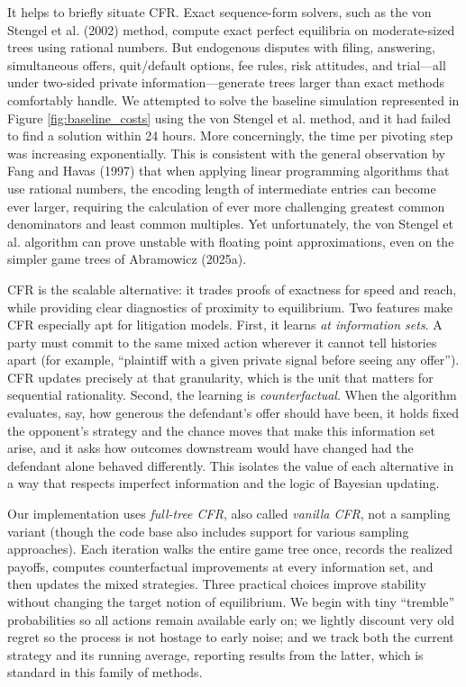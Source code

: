 \documentclass{article}
\begin{document}
It helps to briefly situate CFR. Exact sequence-form solvers, such as the von Stengel et al. (2002) \cite{vonstengelvandenelzentalman} method, compute exact perfect equilibria on moderate-sized trees using rational numbers. But endogenous disputes with filing, answering, simultaneous offers, quit/default options, fee rules, risk attitudes, and trial—all under two-sided private information—generate trees  larger than exact methods comfortably handle. We attempted to solve the baseline simulation represented in Figure \ref{fig:baseline_costs} using the von Stengel et al. method, and it had failed to find a solution within 24 hours. More concerningly, the time per pivoting step was increasing exponentially. This is consistent with the general observation by Fang and Havas (1997) \cite{fanghavas} that when applying linear programming algorithms that use rational numbers, the encoding length of intermediate entries can become ever larger, requiring the calculation of ever more challenging greatest common denominators and least common multiples. Yet unfortunately, the von Stengel et al. algorithm can prove unstable with floating point approximations, even on the simpler game trees of Abramowicz (2025a).

CFR is the scalable alternative: it trades proofs of exactness for speed and reach, while providing clear diagnostics of proximity to equilibrium. Two features make CFR especially apt for litigation models. First, it learns \emph{at information sets}. A party must commit to the same mixed action wherever it cannot tell histories apart (for example, “plaintiff with a given private signal before seeing any offer”). CFR updates precisely at that granularity, which is the unit that matters for sequential rationality. Second, the learning is \emph{counterfactual}. When the algorithm evaluates, say, how generous the defendant’s offer should have been, it holds fixed the opponent’s strategy and the chance moves that make this information set arise, and it asks how outcomes downstream would have changed had the defendant alone behaved differently. This isolates the value of each alternative in a way that respects imperfect information and the logic of Bayesian updating.

Our implementation uses \emph{full-tree CFR}, also called \emph{vanilla CFR}, not a sampling variant (though the code base also includes support for various sampling approaches).  Each iteration walks the entire game tree once, records the realized payoffs, computes counterfactual improvements at every information set, and then updates the mixed strategies. Three practical choices improve stability without changing the target notion of equilibrium. We begin with tiny “tremble” probabilities so all actions remain available early on; we lightly discount very old regret so the process is not hostage to early noise; and we track both the current strategy and its running average, reporting results from the latter, which is standard in this family of methods.
\end{document}
